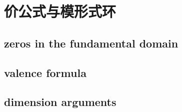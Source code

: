 \section{价公式与模形式环}
\label{b3:sec:2305}


\subsection{zeros in the fundamental domain}
\label{b3:subsec:230501}

\subsection{valence formula}
\label{b3:subsec:230502}

\subsection{dimension arguments}
\label{b3:subsec:230503}


